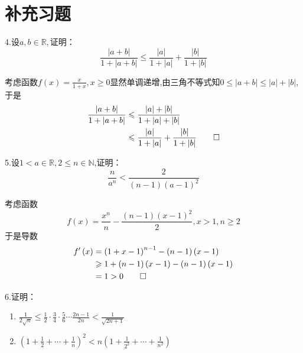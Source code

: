 \section{补充习题}
4.设$a,b\in\mathbb{R},$证明：\[
\frac{
    \left|a+b\right|
}{1+\left|a+b\right|}\leqslant\frac{\left|a\right|}{1+\left|a\right|}+\frac{\left|b\right|}{1+\left|b\right|}
\]\begin{Proof}
    考虑函数$\displaystyle f\left(x\right)=\frac{x}{1+x},x\geqslant 0$显然单调递增,由三角不等式知$0\leqslant \left|a+b\right|\leqslant\left|a\right|+\left|b\right|$,于是\begin{align*}
        \frac{
            \left|a+b\right|
        }{1+\left|a+b\right|}&\leqslant\frac{\left|a\right|+\left|b\right|}{
            1+\left|a\right|+\left|b\right|
        }\\
        &\leqslant
        \frac{\left|a\right|}{1+\left|a\right|}+\frac{\left|b\right|}{1+\left|b\right|}\qedhere
    \end{align*}
\end{Proof}
5.设$1<a\in\mathbb{R},2\leqslant n\in\mathbb{N}$,证明：\[
\frac{n}{a^n}<\frac{2}{\left(n-1\right)\left(a-1\right)^2}
\]
\begin{Proof}
    考虑函数\[
    f\left(x\right)=\frac{x^n}{n}-\frac{
        \left(n-1\right)\left(x-1\right)^2
    }{2},x>1,n\geqslant 2
    \]于是导数\begin{align*}
        f'\left(x\right)&=\left(1+x-1\right)^{n-1}-\left(n-1\right)\left(x-1\right)\\
        &\geqslant 1+\left(n-1\right)\left(x-1\right)-\left(n-1\right)\left(x-1\right)\\
        &=1>0\qedhere
    \end{align*}
\end{Proof}
6.证明：\begin{enumerate}[label={\textup{(\arabic*)}}]
    \item $\displaystyle
    \frac{1}{2\sqrt{n}}\leqslant \frac{1}{2}\cdot\frac{3}{4}\cdot\frac{5}{6}\cdots\frac{2n-1}{2n}<\frac{1}{\sqrt{2n+1}}
    $
    \item $\displaystyle
    \left(
        1+\frac{1}{2}+\cdots+\frac{1}{n}
    \right)^2<n\left(
        1+\frac{1}{2^2}+\cdots+\frac{1}{n^2}
    \right)
    $
\end{enumerate}
